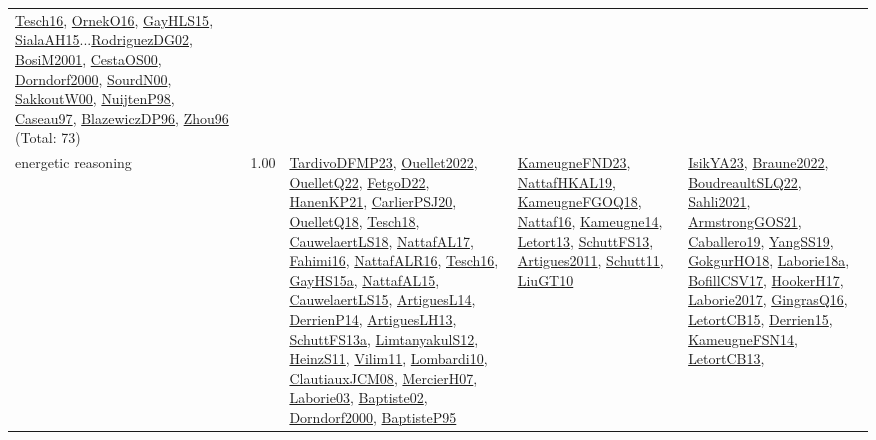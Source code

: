 {\begin{longtable}{p{3cm}r>{\raggedright\arraybackslash}p{6cm}>{\raggedright\arraybackslash}p{6cm}>{\raggedright\arraybackslash}p{8cm}}
\hyperref[detail:Tesch16]{Tesch16}, \hyperref[detail:OrnekO16]{OrnekO16}, \hyperref[detail:GayHLS15]{GayHLS15}, \hyperref[detail:SialaAH15]{SialaAH15}...\hyperref[detail:RodriguezDG02]{RodriguezDG02}, \hyperref[detail:BosiM2001]{BosiM2001}, \hyperref[detail:CestaOS00]{CestaOS00}, \hyperref[detail:Dorndorf2000]{Dorndorf2000}, \hyperref[detail:SourdN00]{SourdN00}, \hyperref[detail:SakkoutW00]{SakkoutW00}, \hyperref[detail:NuijtenP98]{NuijtenP98}, \hyperref[detail:Caseau97]{Caseau97}, \hyperref[detail:BlazewiczDP96]{BlazewiczDP96}, \hyperref[detail:Zhou96]{Zhou96} (Total: 73)\\
\index{energetic reasoning}\index{Algorithms!energetic reasoning}energetic reasoning &  1.00 & \hyperref[detail:TardivoDFMP23]{TardivoDFMP23}, \hyperref[detail:Ouellet2022]{Ouellet2022}, \hyperref[detail:OuelletQ22]{OuelletQ22}, \hyperref[detail:FetgoD22]{FetgoD22}, \hyperref[detail:HanenKP21]{HanenKP21}, \hyperref[detail:CarlierPSJ20]{CarlierPSJ20}, \hyperref[detail:OuelletQ18]{OuelletQ18}, \hyperref[detail:Tesch18]{Tesch18}, \hyperref[detail:CauwelaertLS18]{CauwelaertLS18}, \hyperref[detail:NattafAL17]{NattafAL17}, \hyperref[detail:Fahimi16]{Fahimi16}, \hyperref[detail:NattafALR16]{NattafALR16}, \hyperref[detail:Tesch16]{Tesch16}, \hyperref[detail:GayHS15a]{GayHS15a}, \hyperref[detail:NattafAL15]{NattafAL15}, \hyperref[detail:CauwelaertLS15]{CauwelaertLS15}, \hyperref[detail:ArtiguesL14]{ArtiguesL14}, \hyperref[detail:DerrienP14]{DerrienP14}, \hyperref[detail:ArtiguesLH13]{ArtiguesLH13}, \hyperref[detail:SchuttFS13a]{SchuttFS13a}, \hyperref[detail:LimtanyakulS12]{LimtanyakulS12}, \hyperref[detail:HeinzS11]{HeinzS11}, \hyperref[detail:Vilim11]{Vilim11}, \hyperref[detail:Lombardi10]{Lombardi10}, \hyperref[detail:ClautiauxJCM08]{ClautiauxJCM08}, \hyperref[detail:MercierH07]{MercierH07}, \hyperref[detail:Laborie03]{Laborie03}, \hyperref[detail:Baptiste02]{Baptiste02}, \hyperref[detail:Dorndorf2000]{Dorndorf2000}, \hyperref[detail:BaptisteP95]{BaptisteP95} & \hyperref[detail:KameugneFND23]{KameugneFND23}, \hyperref[detail:NattafHKAL19]{NattafHKAL19}, \hyperref[detail:KameugneFGOQ18]{KameugneFGOQ18}, \hyperref[detail:Nattaf16]{Nattaf16}, \hyperref[detail:Kameugne14]{Kameugne14}, \hyperref[detail:Letort13]{Letort13}, \hyperref[detail:SchuttFS13]{SchuttFS13}, \hyperref[detail:Artigues2011]{Artigues2011}, \hyperref[detail:Schutt11]{Schutt11}, \hyperref[detail:LiuGT10]{LiuGT10} & \hyperref[detail:IsikYA23]{IsikYA23}, \hyperref[detail:Braune2022]{Braune2022}, \hyperref[detail:BoudreaultSLQ22]{BoudreaultSLQ22}, \hyperref[detail:Sahli2021]{Sahli2021}, \hyperref[detail:ArmstrongGOS21]{ArmstrongGOS21}, \hyperref[detail:Caballero19]{Caballero19}, \hyperref[detail:YangSS19]{YangSS19}, \hyperref[detail:GokgurHO18]{GokgurHO18}, \hyperref[detail:Laborie18a]{Laborie18a}, \hyperref[detail:BofillCSV17]{BofillCSV17}, \hyperref[detail:HookerH17]{HookerH17}, \hyperref[detail:Laborie2017]{Laborie2017}, \hyperref[detail:GingrasQ16]{GingrasQ16}, \hyperref[detail:LetortCB15]{LetortCB15}, \hyperref[detail:Derrien15]{Derrien15}, \hyperref[detail:KameugneFSN14]{KameugneFSN14}, \hyperref[detail:LetortCB13]{LetortCB13}, 
\end{longtable}}
